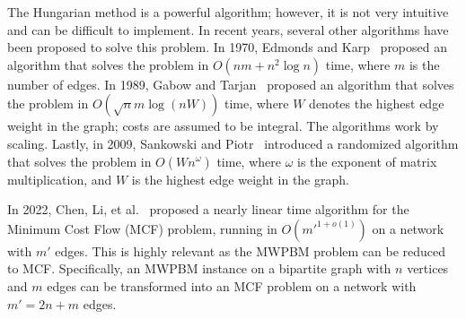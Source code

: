 The Hungarian method is a powerful algorithm; however, it is not very intuitive and can be difficult to implement. In recent years, several other algorithms have been proposed to solve this problem. In 1970, Edmonds and Karp~\cite{edmonds1972theoretical} proposed an algorithm that solves the problem in $O(nm + n^2 \log n)$ time, where $m$ is the number of edges. In 1989, Gabow and Tarjan~\cite{gabow1989faster} proposed an algorithm that solves the problem in $O(\sqrt{n}m \log(nW))$ time, where $W$ denotes the highest edge weight in the graph; costs are assumed to be integral. The algorithms work by scaling. Lastly, in 2009, Sankowski and Piotr~\cite{sankowski2009maximum} introduced a randomized algorithm that solves the problem in $O(Wn^\omega)$ time, where $\omega$ is the exponent of matrix multiplication, and $W$ is the highest edge weight in the graph.

In 2022, Chen, Li, et al.~\cite{chen2022maximum} proposed a nearly linear time algorithm for the Minimum Cost Flow (MCF) problem, running in $O(m'^{1+o(1)})$ on a network with $m'$ edges. This is highly relevant as the MWPBM problem can be reduced to MCF. Specifically, an MWPBM instance on a bipartite graph with $n$ vertices and $m$ edges can be transformed into an MCF problem on a network with $m' = 2n + m$ edges.

